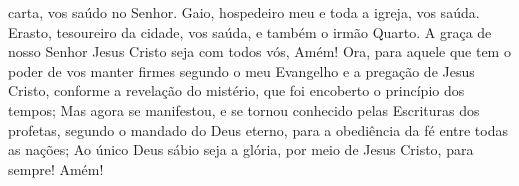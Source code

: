 {{} carta, vos saúdo no Senhor.
Gaio, hospedeiro meu e toda a igreja, vos saúda. Erasto, tesoureiro da cidade, vos saúda, e também o irmão Quarto.
A graça de nosso Senhor Jesus Cristo seja com todos vós, Amém!
Ora, para aquele que tem o poder de vos manter firmes segundo o meu Evangelho e a pregação de Jesus Cristo, conforme a revelação do mistério, que foi encoberto
{} o princípio dos tempos;
Mas agora se manifestou, e se tornou conhecido pelas Escrituras dos profetas, segundo o mandado do Deus eterno, para a obediência da fé entre todas as nações;
Ao único Deus sábio seja a glória, por meio de Jesus Cristo, para
{} sempre! Amém!
{}
\par }